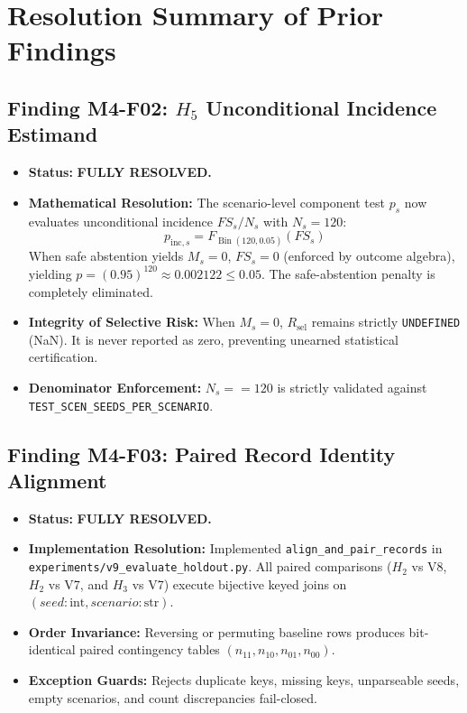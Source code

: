 \documentclass[10pt,a4paper]{article}
\begin{document}
\section{Resolution Summary of Prior Findings}

\subsection{Finding M4-F02: $H_5$ Unconditional Incidence Estimand}
\begin{itemize}
    \item \textbf{Status:} \textbf{FULLY RESOLVED.}
    \item \textbf{Mathematical Resolution:} The scenario-level component test $p_s$ now evaluates unconditional incidence $FS_s / N_s$ with $N_s = 120$:
    \begin{equation}
    p_{\mathrm{inc}, s} = F_{\operatorname{Bin}(120, 0.05)}(FS_s)
    \end{equation}
    When safe abstention yields $M_s = 0$, $FS_s = 0$ (enforced by outcome algebra), yielding $p = (0.95)^{120} \approx 0.002122 \le 0.05$. The safe-abstention penalty is completely eliminated.
    \item \textbf{Integrity of Selective Risk:} When $M_s = 0$, $R_{\mathrm{sel}}$ remains strictly \texttt{UNDEFINED} (NaN). It is never reported as zero, preventing unearned statistical certification.
    \item \textbf{Denominator Enforcement:} $N_s == 120$ is strictly validated against \texttt{TEST\_SCEN\_SEEDS\_PER\_SCENARIO}.
\end{itemize}

\subsection{Finding M4-F03: Paired Record Identity Alignment}
\begin{itemize}
    \item \textbf{Status:} \textbf{FULLY RESOLVED.}
    \item \textbf{Implementation Resolution:} Implemented \texttt{align\_and\_pair\_records} in \texttt{experiments/v9\_evaluate\_holdout.py}. All paired comparisons ($H_2$ vs V8, $H_2$ vs V7, and $H_3$ vs V7) execute bijective keyed joins on $(seed: \text{int}, scenario: \text{str})$.
    \item \textbf{Order Invariance:} Reversing or permuting baseline rows produces bit-identical paired contingency tables $(n_{11}, n_{10}, n_{01}, n_{00})$.
    \item \textbf{Exception Guards:} Rejects duplicate keys, missing keys, unparseable seeds, empty scenarios, and count discrepancies fail-closed.
\end{itemize}
\end{document}
